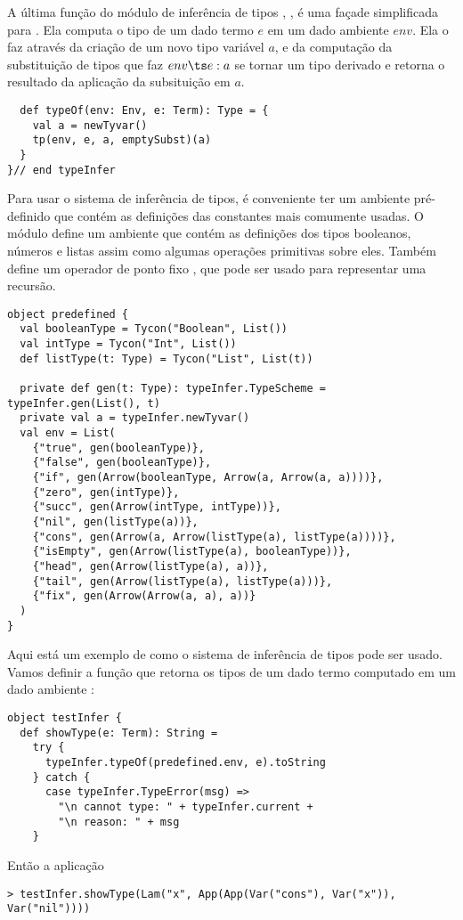 A última função do módulo de inferência de tipos , , é uma façade simplificada
para . Ela computa o tipo de um dado termo
$e$ em um dado ambiente $env$. Ela o faz através da criação de um novo tipo variável $a$, 
e da computação da substituição de tipos que faz $env \ts e: a$  se tornar um tipo derivado 
e retorna o resultado da aplicação da subsituição em $a$.
\begin{lstlisting}
  def typeOf(env: Env, e: Term): Type = {
    val a = newTyvar()
    tp(env, e, a, emptySubst)(a)
  }
}// end typeInfer
\end{lstlisting}
Para usar o sistema de inferência de tipos, é conveniente ter um ambiente
pré-definido que contém as definições das constantes mais comumente usadas.
O módulo  define um ambiente  que contém as definições dos tipos 
booleanos, números e listas assim como algumas operações primitivas sobre eles.
Também define um operador de ponto fixo , que pode ser usado para representar uma
recursão.
\begin{lstlisting}
object predefined {
  val booleanType = Tycon("Boolean", List())
  val intType = Tycon("Int", List())
  def listType(t: Type) = Tycon("List", List(t))

  private def gen(t: Type): typeInfer.TypeScheme = typeInfer.gen(List(), t)
  private val a = typeInfer.newTyvar()
  val env = List(
    {"true", gen(booleanType)},
    {"false", gen(booleanType)},
    {"if", gen(Arrow(booleanType, Arrow(a, Arrow(a, a))))},
    {"zero", gen(intType)},
    {"succ", gen(Arrow(intType, intType))},
    {"nil", gen(listType(a))},
    {"cons", gen(Arrow(a, Arrow(listType(a), listType(a))))},
    {"isEmpty", gen(Arrow(listType(a), booleanType))},
    {"head", gen(Arrow(listType(a), a))},
    {"tail", gen(Arrow(listType(a), listType(a)))},
    {"fix", gen(Arrow(Arrow(a, a), a))}
  )
}
\end{lstlisting}
Aqui está um exemplo de como o sistema de inferência de tipos pode ser
usado. Vamos definir a função  que retorna os tipos de um dado
termo computado em um dado ambiente
:
\begin{lstlisting}
object testInfer {
  def showType(e: Term): String =
    try {
      typeInfer.typeOf(predefined.env, e).toString
    } catch {
      case typeInfer.TypeError(msg) => 
        "\n cannot type: " + typeInfer.current +
        "\n reason: " + msg
    }
\end{lstlisting}
Então a aplicação
\begin{lstlisting}
> testInfer.showType(Lam("x", App(App(Var("cons"), Var("x")), Var("nil"))))
\end{lstlisting}
